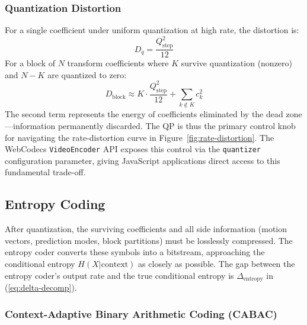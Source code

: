 \subsubsection{Quantization Distortion}

For a single coefficient under uniform quantization at high rate, the
distortion is:
\begin{equation}
  D_q = \frac{Q_{\text{step}}^2}{12}
  \label{eq:quant-distortion}
\end{equation}
For a block of $N$ transform coefficients where $K$ survive quantization
(nonzero) and $N - K$ are quantized to zero:
\begin{equation}
  D_{\text{block}} \approx K \cdot \frac{Q_{\text{step}}^2}{12}
    + \sum_{k \notin K} c_k^2
  \label{eq:block-distortion}
\end{equation}
The second term represents the energy of coefficients eliminated by the
dead zone---information permanently discarded. The QP is thus the primary
control knob for navigating the rate-distortion curve in
Figure~\ref{fig:rate-distortion}. The WebCodecs \texttt{VideoEncoder} API
exposes this control via the \texttt{quantizer} configuration parameter,
giving JavaScript applications direct access to this fundamental
trade-off.

\subsection{Entropy Coding}
\label{sec:entropy-coding}

After quantization, the surviving coefficients and all side information
(motion vectors, prediction modes, block partitions) must be losslessly
compressed. The entropy coder converts these symbols into a bitstream,
approaching the conditional entropy $H(X|\text{context})$ as closely as
possible. The gap between the entropy coder's output rate and the true
conditional entropy is $\Delta_{\text{entropy}}$ in
(\ref{eq:delta-decomp}).

\subsubsection{Context-Adaptive Binary Arithmetic Coding (CABAC)}
\label{sec:cabac}

